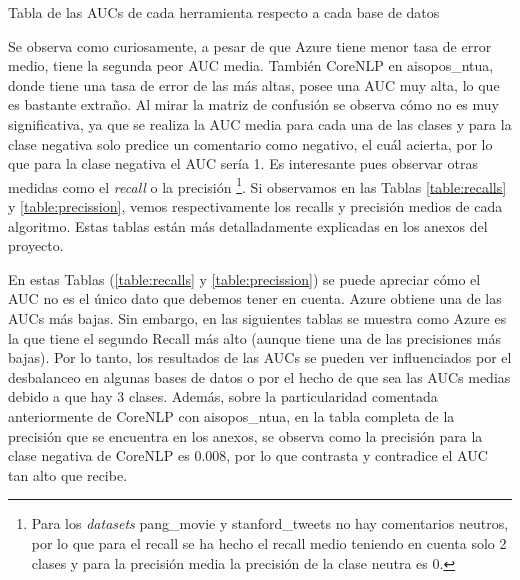 \begin{table} [H]
	
	\caption{Tabla de las AUCs de cada herramienta respecto a cada base de datos}
\end{table}

Se observa como curiosamente, a pesar de que Azure tiene menor tasa de error medio, tiene la segunda peor AUC media. También CoreNLP en aisopos\_ntua, donde tiene una tasa de error de las más altas, posee una AUC muy alta, lo que es bastante extraño. Al mirar la matriz de confusión se observa cómo no es muy significativa, ya que se realiza la AUC media para cada una de las clases y para la clase negativa solo predice un comentario como negativo, el cuál acierta, por lo que para la clase negativa el AUC sería 1. Es interesante pues observar otras medidas como el \textit{recall} o la precisión \footnote{Para los \textit{datasets} pang\_movie y stanford\_tweets no hay comentarios neutros, por lo que para el recall se ha hecho el recall medio teniendo en cuenta solo 2 clases y para la precisión media la precisión de la clase neutra es 0.}. Si observamos en las Tablas \ref{table:recalls} y \ref{table:precission}, vemos respectivamente los recalls y precisión medios de cada algoritmo. Estas tablas están más detalladamente explicadas en los anexos del proyecto.

En estas Tablas (\ref{table:recalls} y \ref{table:precission}) se puede apreciar cómo el AUC no es el único dato que debemos tener en cuenta. Azure obtiene una de las AUCs más bajas. Sin embargo, en las siguientes tablas se muestra como Azure es la que tiene el segundo Recall más alto (aunque tiene una de las precisiones más bajas). Por lo tanto, los resultados de las AUCs se pueden ver influenciados por el desbalanceo en algunas bases de datos o por el hecho de que sea las AUCs medias debido a que hay 3 clases. Además, sobre la particularidad comentada anteriormente de CoreNLP con aisopos\_ntua, en la tabla completa de la precisión que se encuentra en los anexos, se observa como la precisión para la clase negativa de CoreNLP es 0.008, por lo que contrasta y contradice el AUC tan alto que recibe.

